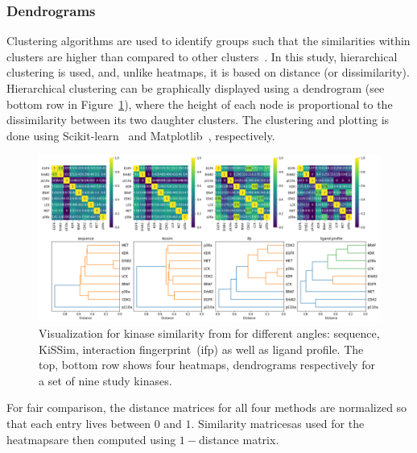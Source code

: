 \documentclass[9pt,training]{livecoms}
\begin{document}
\subsubsection{Dendrograms}
Clustering algorithms are used to identify groups such that the similarities within clusters are higher than compared to other clusters~\cite{Hastie_2009_ESLii}. In this study, hierarchical clustering is used, and, unlike heatmaps, it is based on distance (or dissimilarity).
Hierarchical clustering can be graphically displayed using a dendrogram (see bottom row in Figure~\ref{fig:comparison}), where the height of each node is proportional to the dissimilarity between its two daughter clusters.
The clustering and plotting is done using Scikit-learn~\cite{Pedregosa_2011_JMLR} and Matplotlib~\cite{Hunter_2007_IEEE}, respectively.

\begin{figure}
    \centering
    \includegraphics[width=\textwidth]{all_comparison.png}
    \caption{Visualization for kinase similarity from for different angles: sequence, KiSSim, interaction fingerprint~(ifp) as well as ligand profile. The top, bottom row shows four heatmaps, dendrograms respectively for a set of nine study kinases.}
    \label{fig:comparison}
\end{figure}

For fair comparison, the distance matrices for all four methods are normalized so that each entry lives between $0$ and $1$. Similarity matrices\textemdash as used for the heatmaps\textemdash are then computed using $1-$distance matrix.
\end{document}

